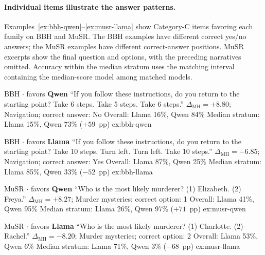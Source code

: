 \paragraph{Individual items illustrate the answer patterns.}
Examples~\ref{ex:bbh-qwen}--\ref{ex:musr-llama} show Category-C items favoring each family on BBH and MuSR. The BBH examples have different correct yes/no answers; the MuSR examples have different correct-answer positions. MuSR excerpts show the final question and options, with the preceding narratives omitted. Accuracy within the median stratum uses the matching interval containing the median-score model among matched models.
\noindent
\begin{minipage}[t]{0.485\linewidth}
\itemexample
  {BBH $\cdot$ favors \textbf{Qwen}}
  {``If you follow these instructions, do you return to the starting point? Take 6 steps. Take 5 steps. Take 6 steps.''}
  {$\Delta_{\mathrm{MH}}=+8.80$; Navigation; correct answer: No}
  {Overall: Llama 16\%, Qwen 84\%}
  {Median stratum: Llama 15\%, Qwen 73\% ($+59$~pp)}
  {ex:bbh-qwen}
\end{minipage}\hfill
\begin{minipage}[t]{0.485\linewidth}
\itemexample
  {BBH $\cdot$ favors \textbf{Llama}}
  {``If you follow these instructions, do you return to the starting point? Take 10 steps. Turn left. Turn left. Take 10 steps.''}
  {$\Delta_{\mathrm{MH}}=-6.85$; Navigation; correct answer: Yes}
  {Overall: Llama 87\%, Qwen 25\%}
  {Median stratum: Llama 85\%, Qwen 33\% ($-52$~pp)}
  {ex:bbh-llama}
\end{minipage}

\medskip

\noindent
\begin{minipage}[t]{0.485\linewidth}
\itemexample
  {MuSR $\cdot$ favors \textbf{Qwen}}
  {``Who is the most likely murderer? (1) Elizabeth. (2) Freya.''}
  {$\Delta_{\mathrm{MH}}=+8.27$; Murder mysteries; correct option: 1}
  {Overall: Llama 41\%, Qwen 95\%}
  {Median stratum: Llama 26\%, Qwen 97\% ($+71$~pp)}
  {ex:musr-qwen}
\end{minipage}\hfill
\begin{minipage}[t]{0.485\linewidth}
\itemexample
  {MuSR $\cdot$ favors \textbf{Llama}}
  {``Who is the most likely murderer? (1) Charlotte. (2) Rachel.''}
  {$\Delta_{\mathrm{MH}}=-8.20$; Murder mysteries; correct option: 2}
  {Overall: Llama 53\%, Qwen 6\%}
  {Median stratum: Llama 71\%, Qwen 3\% ($-68$~pp)}
  {ex:musr-llama}
\end{minipage}

\medskip
